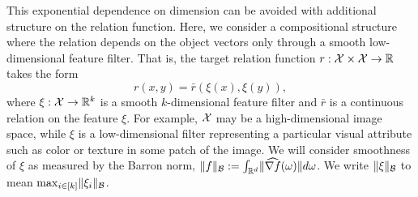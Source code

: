 This exponential dependence on dimension can be avoided with additional structure on the relation function. Here, we consider a compositional structure where the relation depends on the object vectors only through a smooth low-dimensional feature filter. That is, the target relation function $r: {\mathcal{X}} \times {\mathcal{X}} \to \mathbb{R}$ takes the form
\begin{equation*}
    r(x, y) = \bar{r}(\xi(x), \xi(y)),
\end{equation*}
where $\xi : {\mathcal{X}} \to \mathbb{R}^k$ is a smooth $k$-dimensional feature filter and $\bar{r}$ is a continuous relation on the feature $\xi$. For example, ${\mathcal{X}}$ may be a high-dimensional image space, while $\xi$ is a low-dimensional filter representing a particular visual attribute such as color or texture in some patch of the image. We will consider smoothness of $\xi$ as measured by the Barron norm, $\lVert f\rVert_{{\mathcal{B}}} := \int_{\mathbb{R}^d} \lVert\widehat{\nabla f}(\omega)\rVert d\omega$. We write $\lVert\xi\rVert_{{\mathcal{B}}}$ to mean $\max_{i \in [k]} \lVert\xi_i\rVert_{{\mathcal{B}}}$.

